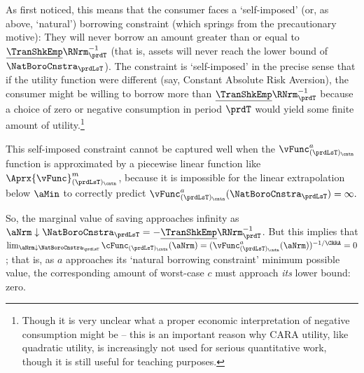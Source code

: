 \documentclass[\econtexRoot/SolvingMicroDSOPs]{subfiles}
\begin{document}
As \cite{zeldesStochastic} first noticed, this means that the consumer faces a `self-imposed' (or, as above, `natural') borrowing constraint (which springs from the precautionary motive): They will never borrow an amount greater than or equal to $\underline{\TranShkEmp}\RNrm_{\prdT}^{-1}$ (that is, assets will never reach the lower bound of $\NatBoroCnstra_{\prdLsT}$).  The constraint is `self-imposed' in the precise sense that if the utility function were different (say, Constant Absolute Risk Aversion), the consumer might be willing to borrow more than $\underline{\TranShkEmp}\RNrm_{\prdT}^{-1}$ because a choice of zero or negative consumption in period $\prdT$ would yield some finite amount of utility.\footnote{Though it is very unclear what a proper economic interpretation of negative consumption might be -- this is an important reason why CARA utility, like quadratic utility, is increasingly not used for serious quantitative work, though it is still useful for teaching purposes.}

This self-imposed constraint cannot be captured well when the $\vFunc^{a}_{(\prdLsT)_\cntn}$ function is approximated by a piecewise linear function like $\Aprx{\vFunc}^{m}_{(\prdLsT)_\cntn}$, because it is impossible for the linear extrapolation below $\aMin$ to correctly predict $\vFunc^{a}_{(\prdLsT)_\cntn}(\NatBoroCnstra_{\prdLsT})=\infty.$ %


So, the marginal value of saving approaches infinity as $\aNrm \downarrow \NatBoroCnstra_{\prdLsT}=-\underline{\TranShkEmp}\RNrm_{\prdT}^{-1}$.  But this implies that $\lim_{\aNrm \downarrow \NatBoroCnstra_{\prdLsT}} \cFunc_{(\prdLsT)_\cntn}(\aNrm) = (\vFunc^{a}_{(\prdLsT)_\cntn}(\aNrm))^{-1/\CRRA} = 0$; that is, as $a$ approaches its `natural borrowing constraint' minimum possible value, the corresponding amount of worst-case $c$ must approach \textit{its} lower bound: zero.
\end{document}
